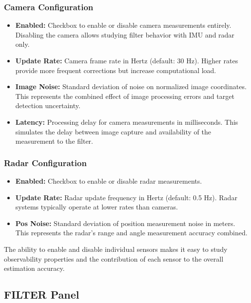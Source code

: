 \documentclass[11pt,a4paper]{article}
\begin{document}
\subsubsection{Camera Configuration}
\begin{itemize}
    \item \textbf{Enabled:} Checkbox to enable or disable camera measurements entirely. Disabling the camera allows studying filter behavior with IMU and radar only.
    
    \item \textbf{Update Rate:} Camera frame rate in Hertz (default: 30 Hz). Higher rates provide more frequent corrections but increase computational load.
    
    \item \textbf{Image Noise:} Standard deviation of noise on normalized image coordinates. This represents the combined effect of image processing errors and target detection uncertainty.
    
    \item \textbf{Latency:} Processing delay for camera measurements in milliseconds. This simulates the delay between image capture and availability of the measurement to the filter.
\end{itemize}

\subsubsection{Radar Configuration}
\begin{itemize}
    \item \textbf{Enabled:} Checkbox to enable or disable radar measurements.
    
    \item \textbf{Update Rate:} Radar update frequency in Hertz (default: 0.5 Hz). Radar systems typically operate at lower rates than cameras.
    
    \item \textbf{Pos Noise:} Standard deviation of position measurement noise in meters. This represents the radar's range and angle measurement accuracy combined.
\end{itemize}

The ability to enable and disable individual sensors makes it easy to study observability properties and the contribution of each sensor to the overall estimation accuracy.

\subsection{FILTER Panel}
\end{document}
